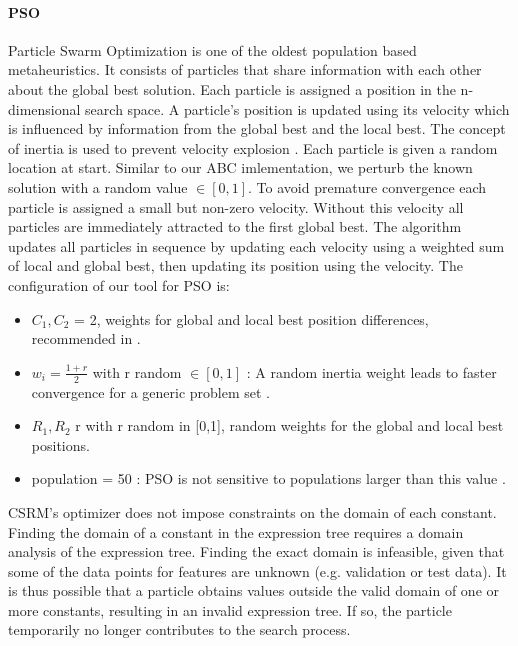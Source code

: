 \paragraph{PSO}
Particle Swarm Optimization \cite{PSO} is one of the oldest population based metaheuristics. It consists of particles that share information with each other about the global best solution.
Each particle is assigned a position in the n-dimensional search space. A particle's position is updated using its velocity which is influenced by information from the global best and the local best. The concept of inertia is used to prevent velocity explosion \cite{PSOExplosion}.
Each particle is given a random location at start. Similar to our ABC imlementation, we perturb the known solution with a random value $\in [0,1]$.
To avoid premature convergence each particle is assigned a small but non-zero velocity. Without this velocity all particles are immediately attracted to the first global best. 
The algorithm updates all particles in sequence by updating each velocity using a weighted sum of local and global best, then updating its position using the velocity.
The configuration of our tool for PSO is:
\begin{itemize}
\item $C_1, C_2$ = 2, weights for global and local best position differences, recommended in \cite{PSOParameter}.
\item $w_i = \frac{1 + r}{2}$ with r random $\in [0,1]$ : A random inertia weight leads to faster convergence for a generic problem set \cite{PSOInertia}.
\item $R_1, R_2$ r with r random in [0,1], random weights for the global and local best positions. 
\item population = 50 : PSO is not sensitive to populations larger than this value \cite{SwarmIntelligence}.
\end{itemize}
CSRM's optimizer does not impose constraints on the domain of each constant. Finding the domain of a constant in the expression tree requires a domain analysis of the expression tree. Finding the exact domain is infeasible, given that some of the data points for features are unknown (e.g. validation or test data). It is thus possible that a particle obtains values outside the valid domain of one or more constants, resulting in an invalid expression tree. If so, the particle temporarily no longer contributes to the search process.
